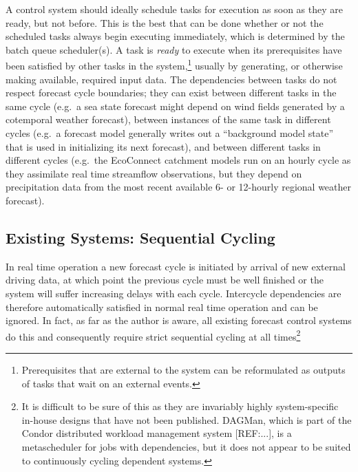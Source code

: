 \documentclass[11pt,a4paper]{article}
\begin{document}
A control system should ideally schedule tasks for execution as soon as
they are ready, but not before.  This is the best that can be done
whether or not the scheduled tasks always begin executing immediately,
which is determined by the batch queue scheduler(s). A task is {\em
ready} to execute when its prerequisites have been satisfied by other
tasks in the system,\footnote{Prerequisites that are external to the
system can be reformulated as outputs of tasks that wait on an external
events.} usually by generating, or otherwise making available, required
input data. The dependencies between tasks do not respect forecast cycle
boundaries; they can exist between different tasks in the same cycle
(e.g.\ a sea state forecast might depend on wind fields generated by a
cotemporal weather forecast), between instances of the same task in
different cycles (e.g.\ a forecast model generally writes out a
``background model state'' that is used in initializing its next
forecast), and between different tasks in different cycles (e.g.\ the
EcoConnect catchment models run on an hourly cycle as they assimilate
real time streamflow observations, but they depend on precipitation data
from the most recent available 6- or 12-hourly regional weather
forecast).


\subsection{Existing Systems: Sequential Cycling}

In real time operation a new forecast cycle is initiated by arrival of
new external driving data, at which point the previous cycle must be
well finished or the system will suffer increasing delays with each
cycle. Intercycle dependencies are therefore automatically satisfied in
normal real time operation and can be ignored. In fact, as far as the
author is aware, all existing forecast control systems do this and
consequently require strict sequential cycling at all times\footnote{It
is difficult to be sure of this as they are invariably highly
system-specific in-house designs that have not been published.
DAGMan, which is part of the Condor distributed workload management
system [REF:...], is a metascheduler for jobs with dependencies, but it
does not appear to be suited to continuously cycling dependent systems.} 
\end{document}
